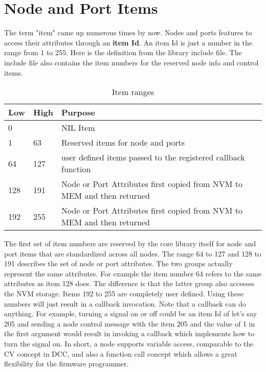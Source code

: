 \section{Node and Port Items}

The term "item" came up numerous times by now. Nodes and ports features to access their attributes through an \textbf{item Id}. An item Id is just a number in the range from 1 to 255. Here is the definition from the library include file. The include file also contains the item numbers for the reserved node info and control items.

\begin{table}[!ht]
    \begin{center}
        \caption{Item ranges}
        \begin{tabular}{|l|l|p{}|}
            \toprule
            \textbf{Low} & \textbf{High} & \textbf{Purpose} \\
            \midrule
            0 & & NIL Item \\
            \midrule
            1 & 63 & Reserved items for node and ports \\
            \midrule
            64 & 127 & user defined items passed to the registered callback function \\
            \midrule
            128 & 191 & Node or Port Attributes first copied from NVM to MEM and then returned \\
            \midrule
            192 & 255 & Node or Port Attributes first copied from NVM to MEM and then returned \\
            \bottomrule
        \end{tabular}
    \end{center}
\end{table}

The first set of item numbers are reserved by the core library itself for node and port items that are standardized across all nodes. The range 64 to 127 and 128 to 191 describes the set of node or port attributes. The two groups actually represent the same attributes. For example the item number 64 refers to the same attributes as item 128 does. The difference is that the latter group also accesses the NVM storage. Items 192 to 255 are completely user defined. Using these numbers will just result in a callback invocation. Note that a callback can do anything. For example, turning a signal on or off could be an item Id of let's say 205 and sending a node control message with the item 205 and the value of 1 in the first argument would result in invoking a callback which implements how to turn the signal on. In short, a node supports variable access, comparable to the CV concept in DCC, and also a function call concept which allows a great flexibility for the firmware programmer.

